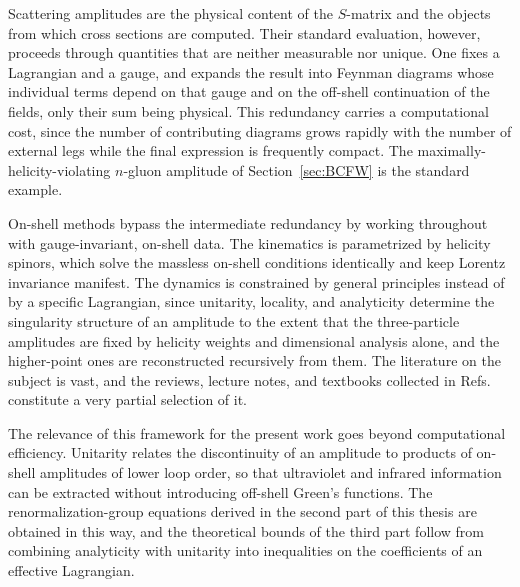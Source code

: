 
Scattering amplitudes are the physical content of the $S$-matrix and the objects from which cross
sections are computed. Their standard evaluation, however, proceeds through quantities that are
neither measurable nor unique. One fixes a Lagrangian and a gauge, and expands the result into
Feynman diagrams whose individual terms depend on that gauge and on the off-shell continuation of
the fields, only their sum being physical. This redundancy carries a computational cost, since the
number of contributing diagrams grows rapidly with the number of external legs while the final
expression is frequently compact. The maximally-helicity-violating $n$-gluon amplitude of
Section~\ref{sec:BCFW} is the standard example.

On-shell methods bypass the intermediate redundancy by working throughout with gauge-invariant,
on-shell data. The kinematics is parametrized by helicity spinors, which solve the massless
on-shell conditions identically and keep Lorentz invariance manifest. The dynamics is constrained by
general principles instead of by a specific Lagrangian, since unitarity, locality, and analyticity
determine the singularity structure of an amplitude to the extent that the three-particle amplitudes
are fixed by helicity weights and dimensional analysis alone, and the higher-point ones are
reconstructed recursively from them. The literature on the subject is vast, and the reviews, lecture
notes, and textbooks collected in
Refs.~\cite{Mangano:1990by,Dixon:1996wi,Peskin:2011in,Ellis:2011cr,Dixon:2011xs,Dixon:2013uaa,%
Elvang:2013cua,Schwartz:2014sze,Henn:2014yza,Elvang:2015rqa,Cheung:2017pzi,Travaglini:2022uwo,%
Badger:2023eqz} constitute a very partial selection of it.

The relevance of this framework for the present work goes beyond computational efficiency. Unitarity
relates the discontinuity of an amplitude to products of on-shell amplitudes of lower loop order, so
that ultraviolet and infrared information can be extracted without introducing off-shell Green's
functions. The renormalization-group equations derived in the second part of this thesis are obtained
in this way, and the theoretical bounds of the third part follow from combining analyticity with
unitarity into inequalities on the coefficients of an effective Lagrangian.


